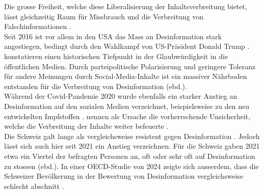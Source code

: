 \documentclass[12pt,a4paper]{article}        %
\begin{document}
Die grosse Freiheit, welche diese Liberalisierung der Inhaltsverbreitung bietet, lässt gleichzeitig Raum für Missbrauch und die Verbreitung von Falschinformationen \parencite[4]{ceron_fake_2021}.\\
Seit 2016 ist vor allem in den USA das Mass an Desinformation stark angestiegen, bedingt durch den Wahlkampf von US-Präsident Donald Trump \parencites[1094f]{lazer_science_2018}{allcott_social_2017}[147]{marx_fake_2020}[147]{tandoc_jr_defining_2018}. \textcite[1094f]{lazer_science_2018} konstatieren einen historischen Tiefpunkt in der Glaubwürdigkeit in die öffentlichen Medien. Durch parteipolitische Polarisierung und geringere Toleranz für andere Meinungen durch Social-Media-Inhalte ist ein massiver Nährboden entstanden für die Verbreitung von Desinformation (ebd.).\\
Während der Covid-Pandemie 2020 wurde ebenfalls ein starker Anstieg an Desinformation auf den sozialen Medien verzeichnet, beispielsweise zu den neu entwickelten Impfstoffen \parencite[2]{khan_fake_2021}. \Textcite[2]{ceron_fake_2021} nennen als Ursache die vorherrschende Unsicherheit, welche die Verbreitung der Inhalte weiter befeuerte \parencite[vgl.\ auch][22f]{zoglauer_konstruierte_2021}. \\

Die Schweiz galt lange als vergleichsweise resistent gegen Desinformation \parencite[26]{vogler_wahrnehmung_2021}. Jedoch lässt sich auch hier seit 2021 ein Anstieg verzeichnen. Für die Schweiz gaben 2021 etwa ein Viertel der befragten Personen an, oft oder sehr oft auf Desinformation zu stossen (ebd.). In einer OECD-Studie von 2024 zeigte sich ausserdem, dass die Schweizer Bevölkerung in der Bewertung von Desinformation vergleichsweise schlecht abschnitt \parencite{wyl_schweizerinnen_2024}.
\end{document}

